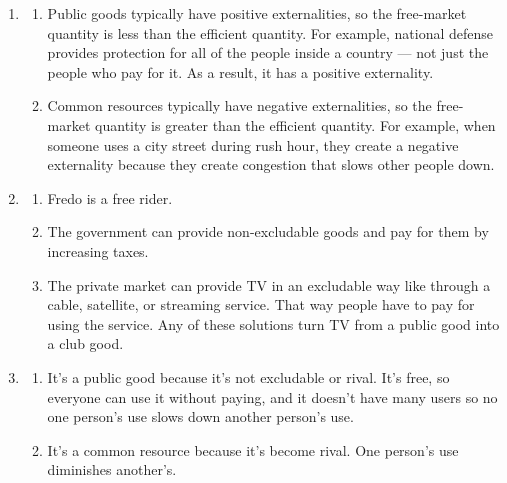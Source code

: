 \documentclass{article}
\begin{document}
\begin{enumerate}
\begin{enumerate}
	\end{enumerate}
	
\item 

	\begin{enumerate}
	
	\item Public goods typically have positive externalities, so the free-market quantity is less than the efficient quantity. For example, national defense provides protection for all of the people inside a country — not just the people who pay for it. As a result, it has a positive externality.
	
	\item Common resources typically have negative externalities, so the free-market quantity is greater than the efficient quantity. For example, when someone uses a city street during rush hour, they create a negative externality because they create congestion that slows other people down.
	
	\end{enumerate}
	
\item

	\begin{enumerate}
	
	\item Fredo is a free rider.
	
	\item The government can provide non-excludable goods and pay for them by increasing taxes.
	
	\item The private market can provide TV in an excludable way like through a cable, satellite, or streaming service. That way people have to pay for using the service. Any of these solutions turn TV from a public good into a club good.
	
	\end{enumerate}
	
\item

	\begin{enumerate}
	
	\item It’s a public good because it’s not excludable or rival. It’s free, so everyone can use it without paying, and it doesn’t have many users so no one person’s use slows down another person’s use.
	
	\item It’s a common resource because it’s become rival. One person’s use diminishes another’s.
	

\end{enumerate}
\end{enumerate}
\end{document}
